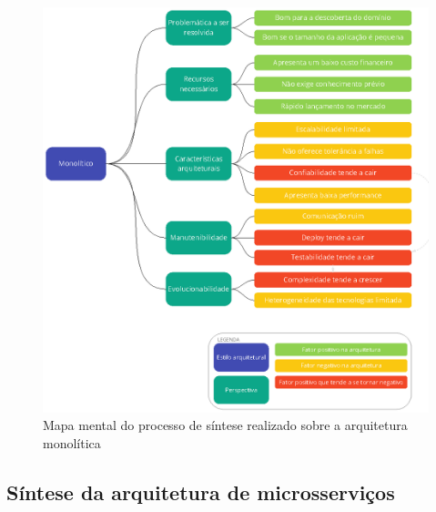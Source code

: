\begin{figure}[h]
  \centering
  \includegraphics[keepaspectratio=true,scale=1]{figuras/sintese-monolitico.eps}
  \caption{Mapa mental do processo de síntese realizado sobre a arquitetura monolítica\label{fig:SinteseMono}}
\end{figure}


\newpage
\subsection{Síntese da arquitetura de microsserviços}

